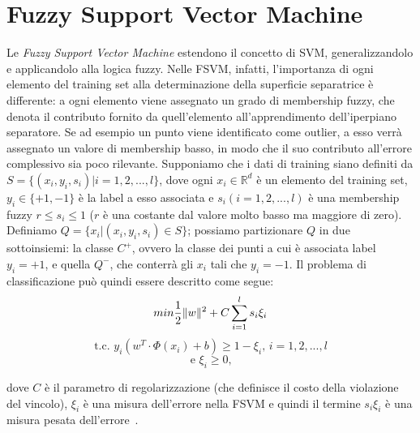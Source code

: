 \documentclass[oneside, openany]{book}
\DeclarePairedDelimiter{\norma}{\lVert}{\rVert}
\begin{document}
	\section{Fuzzy Support Vector Machine}
	Le \textit{Fuzzy Support Vector Machine} estendono il concetto di SVM, generalizzandolo e applicandolo alla logica fuzzy. Nelle FSVM, infatti, l'importanza di ogni elemento del training set alla determinazione della superficie separatrice è differente: a ogni elemento viene assegnato un grado di membership fuzzy, che denota il contributo fornito da quell'elemento all'apprendimento dell'iperpiano separatore. Se ad esempio un punto viene identificato come outlier, a esso verrà assegnato un valore di membership basso, in modo che il suo contributo all'errore complessivo sia poco rilevante. Supponiamo che i dati di training siano definiti da $S = \{(x_i, y_i, s_i)| i=1,2,...,l\}$, dove ogni $x_i \in \mathbb{R}^d$ è un elemento del training set, $y_i \in \{+1, -1\}$ è la label a esso associata e $s_i(i=1,2,...,l)$ è una membership fuzzy $r \leq s_i \leq 1$ ($r$ è una costante dal valore molto basso ma maggiore di zero). Definiamo $Q=\{x_i|(x_i, y_i, s_i)\in S\}$; possiamo partizionare $Q$ in due sottoinsiemi: la classe $C^+$, ovvero la classe dei punti a cui è associata label $y_i=+1$, e quella $Q^-$, che conterrà gli $x_i$ tali che $y_i=-1$. Il problema di classificazione può quindi essere descritto come segue:
		\[
		min \frac{1}{2} \norma{w}^2+C\sum_{i=1}^{l}s_i\xi_i
		\]
		\[	
		\text{t.c. } y_i(w^T\cdot \Phi(x_i)+b)\geq 1-\xi_i \text{, } i=1, 2, ..., l
		\]
		\[
		\text{e } \xi_i \geq 0\text{,}		
		\]
	
	dove $C$ è il parametro di regolarizzazione (che definisce il costo della violazione del vincolo), $\xi_i$ è una misura dell'errore nella FSVM e quindi il termine $s_i\xi_i$ è una misura pesata dell'errore~\cite{bib:fsvm,bib:fsvm2}.\\
	
\end{document}
